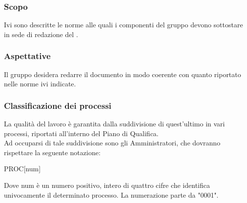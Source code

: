\subsubsection{Scopo}
Ivi sono descritte le norme alle quali i componenti del gruppo devono sottostare in sede di redazione del \PdQ.


\subsubsection{Aspettative}
Il gruppo desidera redarre il documento \PdQ in modo coerente con quanto riportato nelle norme ivi indicate. 



\subsubsection{Classificazione dei processi}
La qualità del lavoro è garantita dalla suddivisione di quest'ultimo in vari processi, riportati all'interno del Piano di Qualifica.\\
Ad occuparsi di tale suddivisione sono gli Amministratori, che dovranno rispettare la seguente notazione: \\
    \begin{center}
        PROC[num]
    \end{center}
Dove num è un numero positivo, intero di quattro cifre che identifica univocamente il determinato processo. La numerazione parte da "0001".

